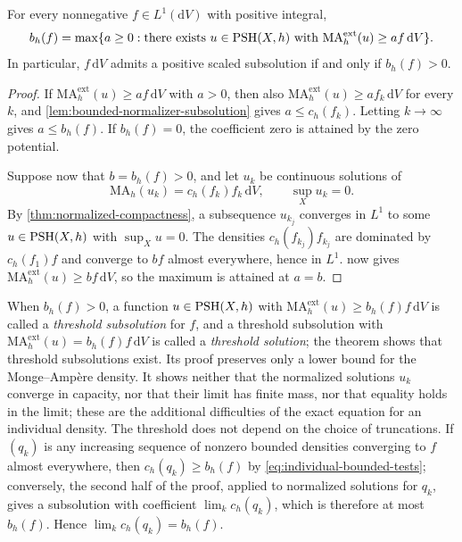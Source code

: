 \begin{theorem}\label{thm:individual-density-subsolution}
For every nonnegative $f\in L^1(\mathrm{d}V)$ with positive integral,
\[
 b_h(f)=\max\{a\geq0:\text{there exists }u\in\mathrm{PSH}(X,h)
       \text{ with }\mathrm{MA}^{\mathrm{ext}}_h(u)
                         \geq af\,\mathrm{d}V\}.
\]
In particular, $f\,\mathrm{d}V$ admits a positive scaled subsolution if and only if $b_h(f)>0$.
\end{theorem}
\begin{proof}
If $\mathrm{MA}^{\mathrm{ext}}_h(u)\geq af\,\mathrm{d}V$ with $a>0$, then also $\mathrm{MA}^{\mathrm{ext}}_h(u)\geq af_k\,\mathrm{d}V$ for every $k$, and \cref{lem:bounded-normalizer-subsolution} gives $a\leq c_h(f_k)$. Letting $k\to\infty$ gives $a\leq b_h(f)$. If $b_h(f)=0$, the coefficient zero is attained by the zero potential.

Suppose now that $b=b_h(f)>0$, and let $u_k$ be continuous solutions of
\[
 \mathrm{MA}_h(u_k)=c_h(f_k)f_k\,\mathrm{d}V,
 \qquad \sup_Xu_k=0.
\]
By \cref{thm:normalized-compactness}, a subsequence $u_{k_j}$ converges in $L^1$ to some $u\in\mathrm{PSH}(X,h)$ with $\sup_Xu=0$. The densities $c_h(f_{k_j})f_{k_j}$ are dominated by $c_h(f_1)f$ and converge to $bf$ almost everywhere, hence in $L^1$.  now gives $\mathrm{MA}^{\mathrm{ext}}_h(u)\geq bf\,\mathrm{d}V$, so the maximum is attained at $a=b$.
\end{proof}

When $b_h(f)>0$, a function $u\in\mathrm{PSH}(X,h)$ with $\mathrm{MA}^{\mathrm{ext}}_h(u)\geq b_h(f)f\,\mathrm{d}V$ is called a \emph{threshold subsolution} for $f$, and a threshold subsolution with $\mathrm{MA}^{\mathrm{ext}}_h(u)=b_h(f)f\,\mathrm{d}V$ is called a \emph{threshold solution}; the theorem shows that threshold subsolutions exist. Its proof preserves only a lower bound for the Monge--Amp\`ere density. It shows neither that the normalized solutions $u_k$ converge in capacity, nor that their limit has finite mass, nor that equality holds in the limit; these are the additional difficulties of the exact equation for an individual density. The threshold does not depend on the choice of truncations. If $(q_k)$ is any increasing sequence of nonzero bounded densities converging to $f$ almost everywhere, then $c_h(q_k)\geq b_h(f)$ by \eqref{eq:individual-bounded-tests}; conversely, the second half of the proof, applied to normalized solutions for $q_k$, gives a subsolution with coefficient $\lim_kc_h(q_k)$, which is therefore at most $b_h(f)$. Hence $\lim_kc_h(q_k)=b_h(f)$.

